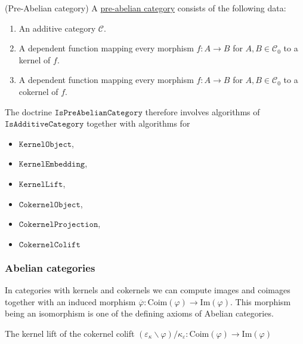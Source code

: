 \begin{definition}{(Pre-Abelian category)}
A \ul{pre-abelian category} consists of the following data:
\begin{enumerate}
\renewcommand{\labelenumi}{(\theenumi)}
\item An additive category $\mathcal{C}$.
\item A dependent function mapping every morphism $f : A \rightarrow B$ for $A, B \in \mathcal{C}_{0}$ to a
kernel of $f$.
\item A dependent function mapping every morphism $f : A \rightarrow B$ for $A, B \in \mathcal{C}_{0}$ to a
cokernel of $f$.
\end{enumerate}
\end{definition}

\begin{doctrine}
The doctrine $\mathtt{IsPreAbelianCategory}$ therefore involves algorithms of $\mathtt{IsAdditiveCategory}$ together with algorithms for
\begin{itemize}
\item $\mathtt{KernelObject}$,
\item $\mathtt{KernelEmbedding}$,
\item $\mathtt{KernelLift}$,
\item $\mathtt{CokernelObject}$,
\item $\mathtt{CokernelProjection}$,
\item $\mathtt{CokernelColift}$
\end{itemize}
\end{doctrine}

\newpage
\subsubsection{Abelian categories}

In categories with kernels and cokernels we can compute images and coimages together with an induced morphism
$\overline{\varphi} : \mathrm{Coim}(\varphi) \rightarrow \mathrm{Im}(\varphi)$. This morphism being an isomorphism
is one of the defining axioms of Abelian categories.

The kernel lift of the cokernel colift
$(\varepsilon_{\kappa}\backslash\varphi)/\kappa_{\varepsilon} : \mathrm{Coim}(\varphi) \rightarrow \mathrm{Im}(\varphi)$

